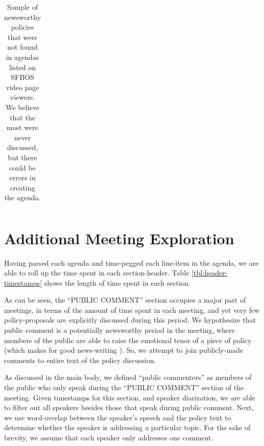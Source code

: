 \documentclass[11pt]{article}
\begin{document}
\begin{table}[t]
\begin{tabularx}{\linewidth}{>{\hangindent=2em}X}
\bottomrule
\end{tabularx}
\caption{Sample of newsworthy policies that were not found in agendas listed on SFBOS video page viewers. We believe that the most were never discussed, but there could be errors in creating the agenda.}
\label{tbl:newsworthy-missing-agenda-items}
\end{table}

\section{Additional Meeting Exploration}
\label{app:additional-meeting-eda}

Having parsed each agenda and time-pegged each line-item in the agenda, we are able to roll up the time spent in each section-header. Table \ref{tbl:header-timestamps} shows the length of time spent in each section.

As can be seen, the ``PUBLIC COMMENT'' section occupies a major part of meetings, in terms of the amount of time spent in each meeting, and yet very few policy-proposals are explicitly discussed during this period. We hypothesize that public comment is a potentially newsworthy period in the meeting, where members of the public are able to raise the emotional tenor of a piece of policy (which makes for good news-writing \cite{uribe2007aresensational}). So, we attempt to join publicly-made comments to entire text of the policy discussion. 

As discussed in the main body, we defined ``public commenters'' as members of the public who only speak during the ``PUBLIC COMMENT'' section of the meeting. Given timestamps for this section, and speaker diarization, we are able to filter out all speakers besides those that speak during public comment. Next, we use word-overlap between the speaker's speech and the policy text to determine whether the speaker is addressing a particular topic. For the sake of brevity, we assume that each speaker only addresses one comment.
\end{document}
